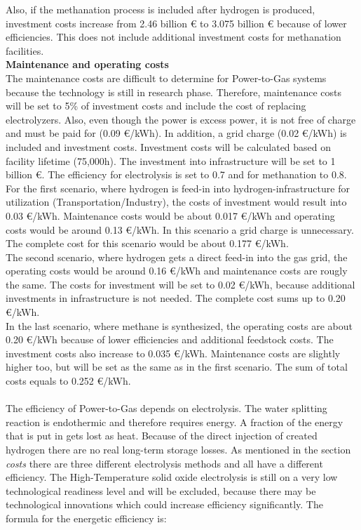 \documentclass[11pt,a4paper]{article}
\begin{document}
\begin{parcolumns}[colwidths={1=2.5 cm, 2=10 cm, 3=2.5 cm}]{3}
{Also, if the methanation process is included after hydrogen is produced, investment costs increase from 2.46 billion \euro{ } to 3.075 billion \euro{ } because of lower efficiencies. This does not include additional investment costs for methanation facilities.
\\
\textbf{Maintenance and operating costs}
\\
The maintenance costs are difficult to determine for Power-to-Gas systems because the technology is still in research phase. Therefore, maintenance costs will be set to 5\% of investment costs and include the cost of replacing electrolyzers. Also, even though the power is excess power, it is not free of charge and must be paid for (0.09 \euro /kWh). In addition, a grid charge (0.02 \euro /kWh) is included and investment costs. Investment costs will be calculated based on facility lifetime (75,000h). The investment into infrastructure will be set to 1 billion \euro . The efficiency for electrolysis is set to 0.7 and for methanation to 0.8.
\\
For the first scenario, where hydrogen is feed-in into hydrogen-infrastructure for utilization (Transportation/Industry), the costs of investment would result into 0.03 \euro /kWh. Maintenance costs would be about 0.017 \euro /kWh and operating costs would be around 0.13 \euro /kWh. In this scenario a grid charge is unnecessary. The complete cost for this scenario would be about 0.177 \euro /kWh.
\\
The second scenario, where hydrogen gets a direct feed-in into the gas grid, the operating costs would be around 0.16 \euro /kWh and maintenance costs are rougly the same. The costs for investment will be set to 0.02 \euro /kWh, because additional investments in infrastructure is not needed. The complete cost sums up to 0.20 \euro /kWh.
\\
In the last scenario, where methane is synthesized, the operating costs are about 0.20 \euro /kWh because of lower efficiencies and additional feedstock costs. The investment costs also increase to 0.035 \euro /kWh. Maintenance costs are slightly higher too, but will be set as the same as in the first scenario. The sum of total costs equals to 0.252 \euro /kWh.\\
 \\
The efficiency of Power-to-Gas depends on electrolysis. The water splitting reaction is endothermic and therefore requires energy. A fraction of the energy that is put in gets lost as heat. Because of the direct injection of created hydrogen there are no real long-term storage losses. As mentioned in the section \textit{costs} there are three different electrolysis methods and all have a different efficiency. The High-Temperature solid oxide electrolysis is still on a very low technological readiness level and will be excluded, because there may be technological innovations which could increase efficiency significantly. The formula for the energetic efficiency is: \\
}
\end{parcolumns}
\end{document}
